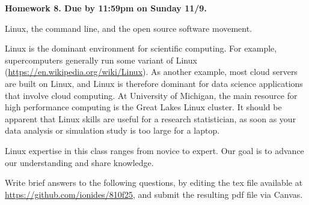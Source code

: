 \documentclass[12pt]{article}
\begin{document}
\begin{center}\bf
Homework 8. Due by 11:59pm on Sunday 11/9.

Linux, the command line, and the open source software movement.

\end{center}

Linux is the dominant environment for scientific computing. For example, supercomputers generally run some variant of Linux (\url{https://en.wikipedia.org/wiki/Linux}). As another example, most cloud servers are built on Linux, and Linux is therefore dominant for data science applications that involve cloud computing. At University of Michigan, the main resource for high performance computing is the Great Lakes Linux cluster. It should be apparent that Linux skills are useful for a research statistician, as soon as your data analysis or simulation study is too large for a laptop.

Linux expertise in this class ranges from novice to expert. Our goal is to advance our understanding and share knowledge.

Write brief answers to the following questions, by editing the tex file available at \url{https://github.com/ionides/810f25}, and submit the resulting pdf file via Canvas.
\end{document}
